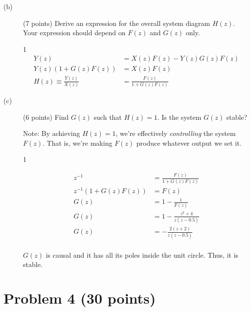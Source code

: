 \documentclass[10pt]{article}
\def\SOLUTIONS{0} %
\def\SolutionsColor{red2}
\begin{document}
\begin{description}	

	\item[(b)] (7 points) Derive an expression for the overall system diagram $H(z)$. Your expression should depend on $F(z)$ and $G(z)$ only.
	
	\if\SOLUTIONS1
	{\color{\SolutionsColor}
		\begin{align} \nonumber
			Y(z) &= X(z)F(z) - Y(z)G(z)F(z) \\
			Y(z)(1 + G(z)F(z)) &= X(z)F(z) \\ \nonumber
			H(z) \equiv \frac{Y(z)}{X(z)} &= \frac{F(z)}{1 + G(z)F(z)}
		\end{align}
	}
	\else\vspace{5cm}
	\fi
	
	\item[(c)] (6 points) Find $G(z)$ such that $H(z) = 1$. Is the system $G(z)$ stable?
		
	\noindent Note: By achieving $H(z) = 1$, we're effectively \textit{controlling} the system $F(z)$. That is, we're making $F(z)$ produce whatever output we set it.
	
	\if\SOLUTIONS1
	{\color{\SolutionsColor}
		\begin{align} \nonumber
		z^{-1} &= \frac{F(z)}{1 + G(z)F(z)} \\ \nonumber
		z^{-1}(1 + G(z)F(z)) &= F(z) \\ \nonumber
		G(z) &= 1 - \frac{1}{F(z)} \\ \nonumber
		G(z) &= 1 - \frac{z^2 + 4}{z(z - 0.5)} \\ \nonumber
		G(z) &= -\frac{2(z + 2)}{z(z - 0.5)} \\ \nonumber
		\end{align}
		
		$G(z)$ is causal and it has all its poles inside the unit circle. Thus, it is stable.
	}
	\else\vspace{5cm}
	\fi

\end{description}


\newpage
\section*{Problem 4 (30 points)}
\end{document}
